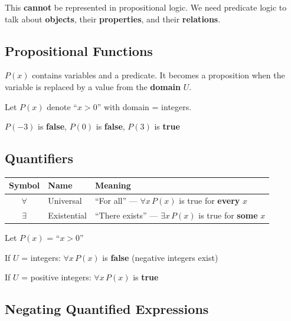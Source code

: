 \documentclass[11pt,a4paper]{article}
\begin{document}
This \textbf{cannot} be represented in propositional logic. We need predicate logic to talk about \textbf{objects}, their \textbf{properties}, and their \textbf{relations}.

\subsection{Propositional Functions}

\begin{definitionbox}
$P(x)$ contains variables and a predicate. It becomes a proposition when the variable is replaced by a value from the \textbf{domain} $U$.
\end{definitionbox}

\begin{examplebox}[Example]
Let $P(x)$ denote ``$x > 0$'' with domain = integers.

$P(-3)$ is \textbf{false}, $P(0)$ is \textbf{false}, $P(3)$ is \textbf{true}
\end{examplebox}

\subsection{Quantifiers}

\begin{center}
\begin{tabular}{c|l|l}
\toprule
\textbf{Symbol} & \textbf{Name} & \textbf{Meaning} \\
\midrule
$\forall$ & Universal & ``For all'' --- $\forall x\, P(x)$ is true for \textbf{every} $x$ \\
$\exists$ & Existential & ``There exists'' --- $\exists x\, P(x)$ is true for \textbf{some} $x$ \\
\bottomrule
\end{tabular}
\end{center}

\begin{examplebox}
Let $P(x)$ = ``$x > 0$''

If $U$ = integers: $\forall x\, P(x)$ is \textbf{false} (negative integers exist)

If $U$ = positive integers: $\forall x\, P(x)$ is \textbf{true}
\end{examplebox}

\subsection{Negating Quantified Expressions}
\end{document}
